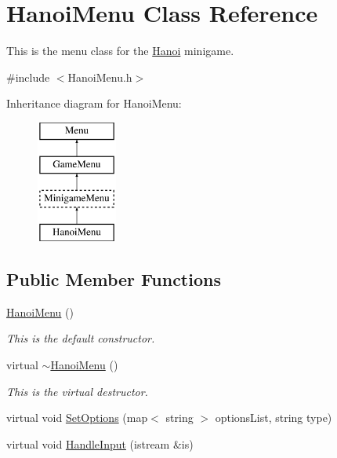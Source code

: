 \hypertarget{classHanoiMenu}{\section{Hanoi\-Menu Class Reference}
\label{classHanoiMenu}
}


This is the menu class for the \hyperlink{classHanoi}{Hanoi} minigame.  




{\ttfamily \#include $<$Hanoi\-Menu.\-h$>$}

Inheritance diagram for Hanoi\-Menu\-:\begin{figure}[H]
\begin{center}
\leavevmode
\includegraphics[height=4.000000cm]{classHanoiMenu}
\end{center}
\end{figure}
\subsection*{Public Member Functions}
\begin{DoxyCompactItemize}
\item 
\hypertarget{classHanoiMenu_a77aa5dc29b4c2954983e0471b8421d57}{\hyperlink{classHanoiMenu_a77aa5dc29b4c2954983e0471b8421d57}{Hanoi\-Menu} ()}\label{classHanoiMenu_a77aa5dc29b4c2954983e0471b8421d57}

\begin{DoxyCompactList}\small\item\em This is the default constructor. \end{DoxyCompactList}\item 
\hypertarget{classHanoiMenu_a80744afb9fe2111305ed0876ea371cd0}{virtual \hyperlink{classHanoiMenu_a80744afb9fe2111305ed0876ea371cd0}{$\sim$\-Hanoi\-Menu} ()}\label{classHanoiMenu_a80744afb9fe2111305ed0876ea371cd0}

\begin{DoxyCompactList}\small\item\em This is the virtual destructor. \end{DoxyCompactList}\item 
virtual void \hyperlink{classHanoiMenu_a1ad3788638502865cb8d52040dcc27f8}{Set\-Options} (map$<$ string $>$ options\-List, string type)
\item 
virtual void \hyperlink{classHanoiMenu_a8d287d810bc4cf49775503470830e48f}{Handle\-Input} (istream \&is)
\end{DoxyCompactItemize}
